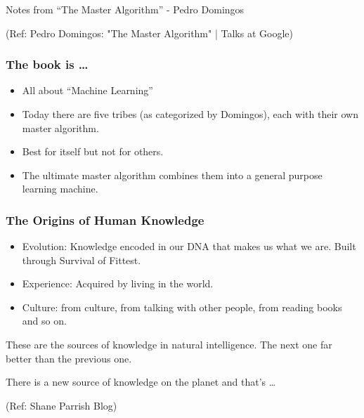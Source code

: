 \begin{frame}[fragile]\frametitle{}

\begin{center}
{\Large Notes from ``The Master Algorithm'' - Pedro Domingos}

  {\tiny (Ref: Pedro Domingos: "The Master Algorithm" | Talks at Google)}

\end{center}


\end{frame}

\begin{frame}[fragile]\frametitle{The book is \ldots}
  \begin{itemize}
    \item All about ``Machine Learning''
	\item Today there are five tribes (as categorized by Domingos), each with their own master algorithm. 
	\item Best for itself but not for others.
	\item The ultimate master algorithm combines them into a general purpose learning machine.
  \end{itemize}
\end{frame}

\begin{frame}[fragile]\frametitle{The Origins of Human Knowledge}
  \begin{itemize}
    \item Evolution:  Knowledge encoded in our DNA that makes us what we are. Built through Survival of Fittest.
	\item Experience: Acquired by living in the world.
	\item Culture: from culture, from talking with other people, from reading books and so on.
	\end{itemize}

	These are the sources of knowledge in natural intelligence. The next one far better than the previous one.
	
	There is a new source of knowledge on the planet and that’s \ldots
	
	
  {\tiny (Ref: Shane Parrish Blog)}
  
\end{frame}

